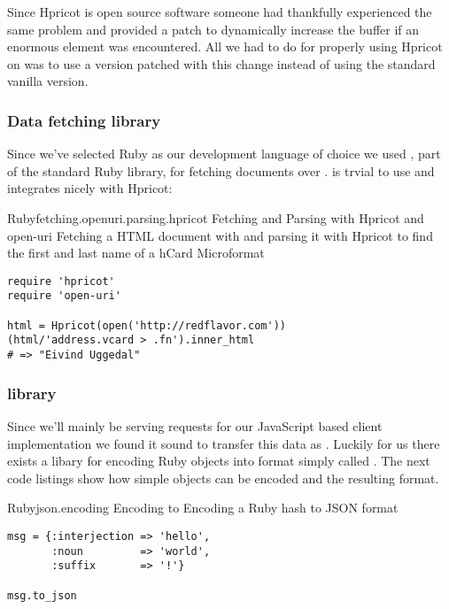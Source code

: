 Since Hpricot is open source software someone had thankfully experienced
the same problem and provided a patch to dynamically increase the
buffer if an enormous  element was encountered. All we had to do
for properly using Hpricot on \urort{} was to use a version patched with this
change instead of using the standard vanilla version.

\subsubsection{Data fetching library}

Since we've selected Ruby as our development language of choice we used
, part of the standard Ruby library, for fetching
documents over .
 is trvial to use and integrates nicely with Hpricot:

\begin{scode}{Ruby}{fetching.openuri.parsing.hpricot}{%
  Fetching and Parsing with Hpricot and open-uri}{%
  Fetching a HTML document with 
  and parsing it with Hpricot to find the first and
  last name of a hCard Microformat}
\begin{lstlisting}
require 'hpricot'
require 'open-uri'

html = Hpricot(open('http://redflavor.com'))
(html/'address.vcard > .fn').inner_html
# => "Eivind Uggedal"
\end{lstlisting}
\end{scode}

\subsubsection{ library}

Since we'll mainly be serving requests
for our JavaScript based client implementation we found it sound to transfer
this data as %
.
Luckily for us there exists a libary for encoding
Ruby objects into  format
simply called %
.
The next code listings show how simple objects can be encoded and the
resulting  format.

\begin{scode}{Ruby}{json.encoding}{%
  Encoding to }{%
  Encoding a Ruby hash to JSON format}
\begin{lstlisting}
msg = {:interjection => 'hello',
       :noun         => 'world',
       :suffix       => '!'}

msg.to_json
\end{lstlisting}
\end{scode}


